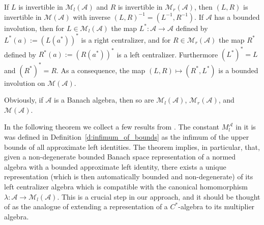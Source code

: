 \documentclass{amsart}
\theoremstyle{plain}
\theoremstyle{definition}
\numberwithin{equation}{section}
\begin{document}
If $L$ is invertible in ${{\mathcal M}_l(\mathcal A)}$ and $R$ is invertible in ${{\mathcal M}_r(\mathcal A)}$, then $(L,R)$ is invertible in ${{\mathcal M}(\mathcal A)}$ with inverse $(L,R)^{-1} = (L^{-1}, R^{-1})$. If ${\mathcal A}$ has a bounded involution, then for $L \in \mathcal{M}_l({\mathcal A})$ the map $L^*: {\mathcal A} \to {\mathcal A}$ defined by $L^*(a) := (L(a^*))^*$ is a right centralizer, and for $R \in \mathcal{M}_r({\mathcal A})$ the map $R^*$ defined by $R^*(a) := (R(a^*))^*$ is a left centralizer. Furthermore $(L^*)^*=L$ and $(R^*)^*=R$. As a consequence, the map $(L,R) \mapsto (R^*, L^*)$ is a bounded involution on $\mathcal{M}({\mathcal A})$.

Obviously, if ${\mathcal A}$ is a Banach algebra, then so are ${{\mathcal M}_l(\mathcal A)}$, ${{\mathcal M}_r(\mathcal A)}$, and ${{\mathcal M}(\mathcal A)}$.

In the following theorem we collect a few results from \cite[Remark~2.2, Theorem~4.1 and Theorem~4.5]{extendart}. The constant $M_l^{\mathcal A}$ in it is was defined in Definition~\ref{d:infimum_of_bounds} as the infimum of the upper bounds of all approximate left identities. The theorem implies, in particular, that, given a non-degenerate bounded Banach space representation of a normed algebra with a bounded approximate left identity, there exists a unique representation (which is then automatically bounded and non-degenerate) of its left centralizer algebra which is compatible with the canonical homomorphism $\lambda: {\mathcal A} \to {{\mathcal M}_l(\mathcal A)}$. This is a crucial step in our approach, and it should be thought of as the analogue of extending a representation of a $C^*$-algebra to its multiplier algebra.
\end{document}
